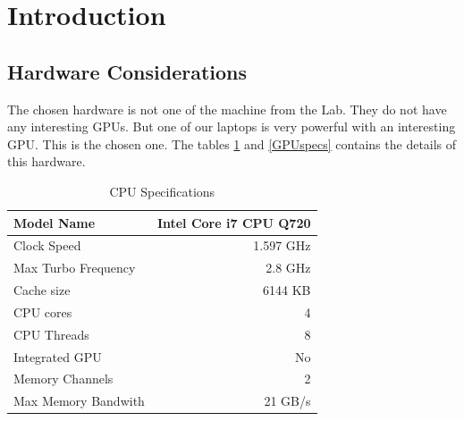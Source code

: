 \documentclass[fleqn,11pt]{SelfArx} %
\affiliation{\textsuperscript{1}RB812 \hfill \textsuperscript{2}AC5612 \hfill \textsuperscript{3}GF210}
\begin{document}



\flushbottom %

\maketitle %

\tableofcontents %

\thispagestyle{empty} %


\section{Introduction}

\subsection{Hardware Considerations}

The chosen hardware is not one of the machine from the Lab. They do not have any interesting GPUs. But one of our laptops is very powerful with an interesting GPU. This is the chosen one. The tables \ref{CPUspec} and \ref{GPUspecs} contains the details of this hardware.

\begin{table}[h]
	\centering

	\begin{tabular}{|l|r|}
		\hline
		Model Name & Intel Core i7 CPU Q720 \\
		\hline
		Clock Speed & 1.597 GHz \\
		\hline
		Max Turbo Frequency & 2.8 GHz \\
		\hline
		Cache size & 6144 KB \\
		\hline
		CPU cores & 4 \\
		\hline
		CPU Threads & 8 \\
		\hline
		Integrated GPU & No \\
		\hline
		Memory Channels & 2 \\
		\hline
		Max Memory Bandwith & 21 GB/s \\
		\hline
	\end{tabular}

	\caption{CPU Specifications}
	\label{CPUspec}
\end{table}
\end{document}

